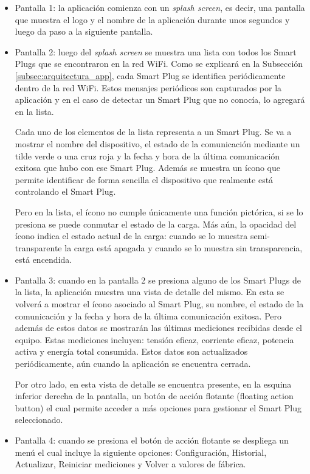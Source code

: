 \begin{itemize}
\item  Pantalla 1: la aplicación comienza con un \textit{splash screen}, es decir, una pantalla que muestra el logo y el nombre de la aplicación durante unos segundos y luego da paso a la siguiente pantalla.

\item Pantalla 2: luego del \textit{splash screen} se muestra una lista con todos los Smart Plugs que se encontraron en la red WiFi. Como se explicará en la Subsección \ref{subsec:arquitectura_app}, cada Smart Plug se identifica periódicamente dentro de la red WiFi. Estos mensajes periódicos son capturados por la aplicación y en el caso de detectar un Smart Plug que no conocía, lo agregará en la lista. 

Cada uno de los elementos de la lista representa a un Smart Plug. Se va a mostrar el nombre del dispositivo, el estado de la comunicación mediante un tilde verde o una cruz roja y la fecha y hora de la última comunicación exitosa que hubo con ese Smart Plug. Además se muestra un ícono que permite identificar de forma sencilla el dispositivo que realmente está controlando el Smart Plug. 

Pero en la lista, el ícono no cumple únicamente una función pictórica, si se lo presiona se puede conmutar el estado de la carga. Más aún, la opacidad del ícono indica el estado actual de la carga: cuando se lo muestra semi-transparente la carga está apagada y cuando se lo muestra sin transparencia, está encendida.

\item Pantalla 3: cuando en la pantalla 2 se presiona alguno de los Smart Plugs de la lista, la aplicación muestra una vista de detalle del mismo. En esta se volverá a mostrar el ícono asociado al Smart Plug, su nombre, el estado de la comunicación y la fecha y hora de la última comunicación exitosa. Pero además de estos datos se mostrarán las últimas mediciones recibidas desde el equipo. Estas mediciones incluyen: tensión eficaz, corriente eficaz, potencia activa y energía total consumida. Estos datos son actualizados periódicamente, aún cuando la aplicación se encuentra cerrada.

Por otro lado, en esta vista de detalle se encuentra presente, en la esquina inferior derecha de la pantalla, un botón de acción flotante (floating action button) el cual permite acceder a más opciones para gestionar el Smart Plug seleccionado.

\item Pantalla 4: cuando se presiona el botón de acción flotante se despliega un menú el cual incluye la siguiente opciones: Configuración, Historial, Actualizar, Reiniciar mediciones y Volver a valores de fábrica.


\end{itemize}
